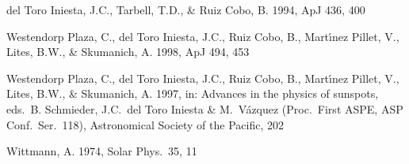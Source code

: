 \begin{thebibliography}{99}
\bibitem{} del Toro Iniesta, J.C., Tarbell, T.D., \& Ruiz Cobo, B. 1994, ApJ 436, 400

\bibitem{} Westendorp Plaza, C., del Toro Iniesta, J.C., Ruiz Cobo, B., Mart\'{\i}nez Pillet, V., Lites, B.W., \& Skumanich, A. 1998, ApJ 494, 453

\bibitem{} Westendorp Plaza, C., del Toro Iniesta, J.C., Ruiz Cobo, B.,
Mart\'{\i}nez Pillet, V., Lites, B.W., \& Skumanich, A. 1997, in:
Advances in the physics of sunspots, eds.\ B. Schmieder, J.C.\ del Toro
Iniesta \& M.\ V\'azquez (Proc.\ First ASPE, ASP Conf.\  Ser.\ 118),
Astronomical Society of the Pacific, 202

\bibitem{} Wittmann, A. 1974, Solar Phys.\ 35, 11

\end{thebibliography}




 



 







